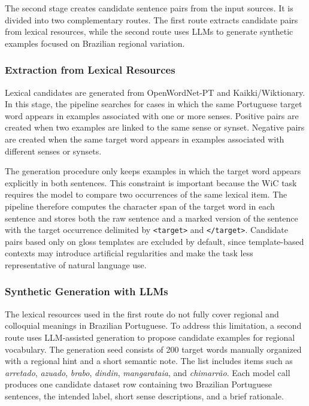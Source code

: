 \documentclass[10pt,a4paper,twocolumn]{article}
\begin{document}
The second stage creates candidate sentence pairs from the input sources. It is divided into two complementary routes. The first route extracts candidate pairs from lexical resources, while the second route uses LLMs to generate synthetic examples focused on Brazilian regional variation.

\subsubsection{Extraction from Lexical Resources}
\label{subsubsec:lexical-extraction}

Lexical candidates are generated from OpenWordNet-PT and Kaikki/Wiktionary. In this stage, the pipeline searches for cases in which the same Portuguese target word appears in examples associated with one or more senses. Positive pairs are created when two examples are linked to the same sense or synset. Negative pairs are created when the same target word appears in examples associated with different senses or synsets.

The generation procedure only keeps examples in which the target word appears explicitly in both sentences. This constraint is important because the WiC task requires the model to compare two occurrences of the same lexical item. The pipeline therefore computes the character span of the target word in each sentence and stores both the raw sentence and a marked version of the sentence with the target occurrence delimited by \texttt{<target>} and \texttt{</target>}. Candidate pairs based only on gloss templates are excluded by default, since template-based contexts may introduce artificial regularities and make the task less representative of natural language use.

\subsubsection{Synthetic Generation with LLMs}
\label{subsubsec:llm-generation}

The lexical resources used in the first route do not fully cover regional and colloquial meanings in Brazilian Portuguese. To address this limitation, a second route uses LLM-assisted generation to propose candidate examples for regional vocabulary. The generation seed consists of 200 target words manually organized with a regional hint and a short semantic note. The list includes items such as \textit{arretado}, \textit{azuado}, \textit{brabo}, \textit{dindin}, \textit{mangarataia}, and \textit{chimarrão}. Each model call produces one candidate dataset row containing two Brazilian Portuguese sentences, the intended label, short sense descriptions, and a brief rationale.
\end{document}
